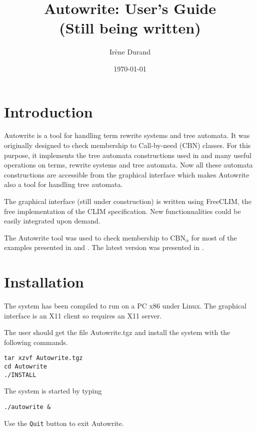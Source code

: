 \documentclass[11pt]{llncs}
\newcommand{\CBN}{\text{CBN}}
\begin{document}

\title{Autowrite: 
User's Guide\\
\small{(Still being written)}}
\author{Ir\`ene Durand}
\date{\today}
\maketitle 
\section{Introduction}
Autowrite is a tool for handling term rewrite
systems and tree automata. 
It was originally designed to check membership to Call-by-need 
($\CBN$) classes.
For this purpose, it implements the tree automata constructions used in
\cite{J96,DM97,DM98,NT02} and many useful
operations on terms, rewrite systems and tree automata.
Now all these automata constructions are accessible from the graphical
interface which makes Autowrite also a tool for handling tree automata.

The graphical interface (still under construction)
is written using FreeCLIM, the free implementation
of the CLIM specification. 
New functionnalities could be easily integrated upon demand.

The Autowrite tool was used to check membership to $\CBN_\alpha$ for most 
of the examples presented in \cite{DM01} and \cite{id-am:ic-2005}.
The latest version was presented in \cite{D04}.

\section{Installation}
The system has been compiled to run on a PC x86 under Linux.
The graphical interface is an X11 client so requires an X11 server.

The user should get the file Autowrite.tgz and install the system
with the following commands.
\begin{verbatim}
tar xzvf Autowrite.tgz
cd Autowrite
./INSTALL
\end{verbatim}
The system is started by typing
\begin{verbatim}
./autowrite &
\end{verbatim}
Use the {\tt Quit} button to exit Autowrite.
\end{document}
